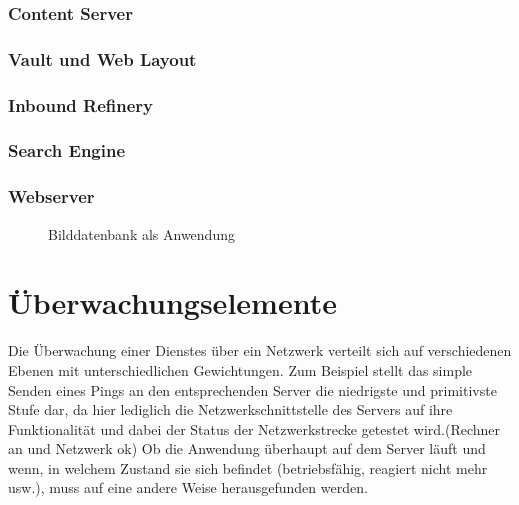 \subsubsection{Content Server}
\subsubsection{Vault und Web Layout}
\subsubsection{Inbound Refinery}
\subsubsection{Search Engine}
\subsubsection{Webserver}

\begin{figure}[ht]
	\centering
		\caption{Bilddatenbank als Anwendung}
		\label{bdbanw}
\end{figure}

\section{Überwachungselemente}
Die Überwachung einer Dienstes über ein Netzwerk verteilt sich auf verschiedenen Ebenen mit unterschiedlichen Gewichtungen.
Zum Beispiel stellt das simple Senden eines Pings an den entsprechenden Server die niedrigste und primitivste Stufe dar, da hier lediglich die Netzwerkschnittstelle des Servers auf ihre Funktionalität und dabei der Status der Netzwerkstrecke getestet wird.(Rechner an und Netzwerk ok)
Ob die Anwendung überhaupt auf dem Server läuft und wenn, in welchem Zustand sie sich befindet (betriebsfähig, reagiert nicht mehr usw.), muss auf eine andere Weise herausgefunden werden.

